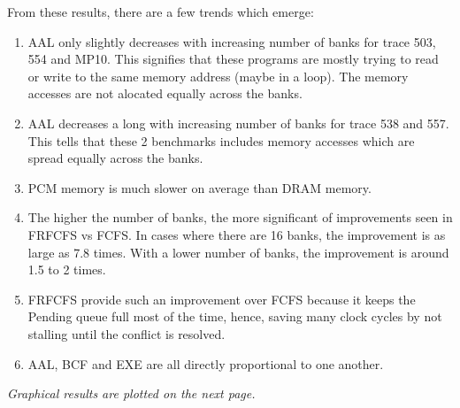 \documentclass[letterpaper, 11pt]{article}
\begin{document}
\newpage
From these results, there are a few trends which emerge:
\begin{enumerate}
	\item AAL only slightly decreases with increasing number of banks for trace 503, 554 and MP10. This signifies that these programs are mostly trying to read or write to the same memory address (maybe in a loop). The memory accesses are not alocated equally across the banks.
	\item AAL decreases a long with increasing number of banks for trace 538 and 557. This tells that these 2 benchmarks includes memory accesses which are spread equally across the banks.
	\item PCM memory is much slower on average than DRAM memory.
	\item The higher the number of banks, the more significant of improvements seen in FRFCFS vs FCFS. In cases where there are 16 banks, the improvement is as large as 7.8 times. With a lower number of banks, the improvement is around 1.5 to 2 times. 
	\item FRFCFS provide such an improvement over FCFS because it keeps the Pending queue full most of the time, hence, saving many clock cycles by not stalling until the conflict is resolved.
	\item AAL, BCF and EXE are all directly proportional to one another.
\end{enumerate}

\textit{Graphical results are plotted on the next page.}
\end{document}
